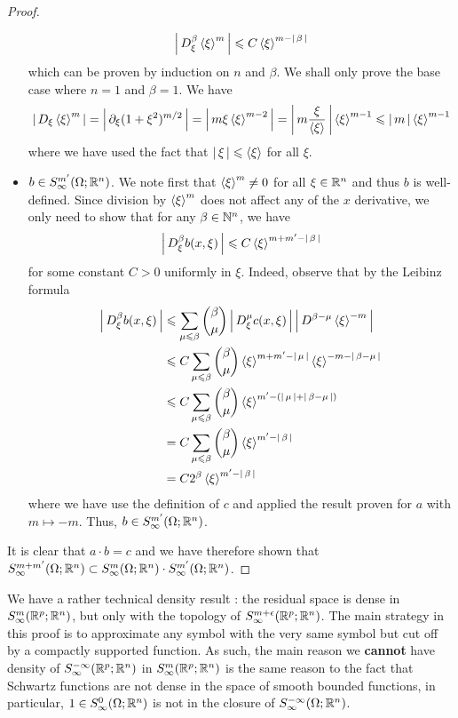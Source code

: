 \documentclass{article}
\begin{document}
\begin{proof}
\begin{itemize}
        \[
        \abs{D^\beta_\xi \sym[\xi]^m} \leq C \sym[\xi]^{m - \abs{\beta}}
        \]
        which can be proven by induction on $n$ and $\beta$. We shall only prove the base case where $n = 1$ and $\beta = 1$. We have 
        \begin{align*}
        \abs{D_\xi \sym[\xi]^m} = \abs{\p_\xi (1 + \xi^2)^{m/2}} = \abs{m\xi \sym[\xi]^{m - 2}} = \abs{m \frac{\xi}{\sym[\xi]}} \sym[\xi]^{m - 1} \leq \abs{m} \sym[\xi]^{m - 1}
        \end{align*}
        where we have used the fact that $\abs{\xi} \leq \sym[\xi]$ for all $\xi$. 
        \item $b \in S^{m'}_\infty(\Omega; \R^n)$. We note first that $\sym[\xi]^m \neq 0$ for all $\xi \in \R^n$ and thus $b$ is well-defined. Since division by $\sym[\xi]^m$ does not affect any of the $x$ derivative, we only need to show that for any $\beta \in \N^n$, we have
        \[
        \abs{D^\beta_\xi b(x, \xi)} \leq C \sym[\xi]^{m + m' - \abs{\beta}}
        \]
        for some constant $C > 0$ uniformly in $\xi$. Indeed, observe that by the Leibinz formula
        \begin{align*}
        \abs{D^\beta_\xi b(x, \xi)} 
        & \leq \sum_{\mu \leq \beta} \binom{\beta}{\mu} \abs{D^\mu_\xi c(x, \xi)} \abs{D^{\beta - \mu} \sym[\xi]^{-m}} \\
        & \leq C \sum_{\mu \leq \beta} \binom{\beta}{\mu} \sym[\xi]^{m + m' - \abs{\mu}} \sym[\xi]^{-m - \abs{\beta - \mu}} \\
        & \leq C \sum_{\mu \leq \beta} \binom{\beta}{\mu} \sym[\xi]^{ m' - (\abs{\mu} +  \abs{\beta - \mu})} \\
        & = C \sum_{\mu \leq \beta} \binom{\beta}{\mu} \sym[\xi]^{ m' -\abs{\beta}} \\
        &= C 2^{\beta} \sym[\xi]^{ m' -\abs{\beta}} 
        \end{align*}
        where we have use the definition of $c$ and applied the result proven for $a$ with $m \mapsto -m$. Thus, $b \in S^{m'}_\infty(\Omega; \R^n)$. 
    \end{itemize}
    It is clear that $a \cdot b = c$ and we have therefore shown that $S^{m + m'}_\infty(\Omega; \R^n) \subset S^{m}_\infty(\Omega; \R^n) \cdot S^{m'}_\infty(\Omega; \R^n)$. 
    
    
    
\end{proof}

We have a rather technical density result : the residual space is dense in $S^{m}_\infty(\R^p; \R^n)$, but only with the topology of $S^{m + \epsilon}_\infty(\R^{p}; \R^n)$. The main strategy in this proof is to approximate any symbol with the very same symbol but cut off by a compactly supported function. As such, the main reason we \textbf{cannot} have density of $S^{-\infty}_\infty(\R^p; \R^n)$ in $S^m_\infty(\R^p; \R^n)$ is the same reason to the fact that Schwartz functions are not dense in the space of smooth bounded functions, in particular, $1 \in S^0_\infty(\Omega; \R^n)$ is not in the closure of $S^{-\infty}_\infty(\Omega; \R^n)$. \\
\end{document}
